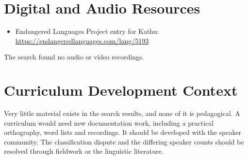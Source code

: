 \documentclass[12pt]{article}
\begin{document}
\section{Digital and Audio Resources}
\begin{itemize}
\item Endangered Languages Project entry for Kathu: \url{https://endangeredlanguages.com/lang/5193}
\end{itemize}
The search found no audio or video recordings.

\section{Curriculum Development Context}
Very little material exists in the search results, and none of it is pedagogical. A curriculum would need new documentation work, including a practical orthography, word lists and recordings. It should be developed with the speaker community. The classification dispute and the differing speaker counts should be resolved through fieldwork or the linguistic literature.
\end{document}
